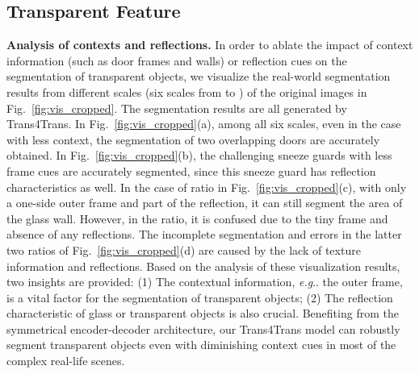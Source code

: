 \documentclass[journal]{IEEEtran}
\makeatletter
\DeclareRobustCommand\onedot{\futurelet\@let@token\@onedot}
\def\@onedot{\ifx\@let@token.\else.\null\fi\xspace}
\def\eg{\emph{e.g}\onedot} \def\Eg{\emph{E.g}\onedot}
\makeatother
\begin{document}
\begin{table}[t]
\centering
{}
\caption{\small Inference time~(ms/frame) of dual-head Trans4Trans is tested in half-/single-precision on various GPUs at .}
\label{tab:inf_time}
\end{table}



\subsection{Transparent Feature}
\label{sec:feature}
\noindent\textbf{Analysis of contexts and reflections.}
In order to ablate the impact of context information (such as door frames and walls) or reflection cues on the segmentation of transparent objects, we visualize the real-world segmentation results from different scales (six scales from  to ) of the original images in Fig.~\ref{fig:vis_cropped}. The segmentation results are all generated by Trans4Trans. In Fig.~\ref{fig:vis_cropped}(a), among all six scales, even in the  case with less context, the segmentation of two overlapping doors are accurately obtained. In Fig.~\ref{fig:vis_cropped}(b), the challenging sneeze guards with less frame cues are accurately segmented, since this sneeze guard has reflection characteristics as well. In the case of  ratio in Fig.~\ref{fig:vis_cropped}(c), with only a one-side outer frame and part of the reflection, it can still segment the area of the glass wall. However, in the  ratio, it is confused due to the tiny frame and absence of any reflections. The incomplete segmentation and errors in the latter two ratios of Fig.~\ref{fig:vis_cropped}(d) are caused by the lack of texture information and reflections. Based on the analysis of these visualization results, two insights are provided: (1) The contextual information, \eg the outer frame, is a vital factor for the segmentation of transparent objects; (2) The reflection characteristic of glass or transparent objects is also crucial. Benefiting from the symmetrical encoder-decoder architecture, our Trans4Trans model can robustly segment transparent objects even with diminishing context cues in most of the complex real-life scenes.
\end{document}

